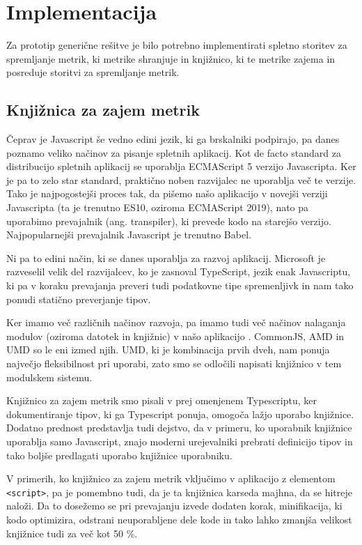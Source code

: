 \documentclass[a4paper, 12pt]{book}
\begin{document}
\section{Implementacija}
\label{ch3:sec2}

Za prototip generične rešitve je bilo potrebno implementirati spletno storitev za spremljanje metrik, ki metrike shranjuje in knjižnico, ki te metrike zajema in posreduje storitvi za spremljanje metrik.

\subsection{Knjižnica za zajem metrik}
\label{ch3:sec2:sub1}

Čeprav je Javascript še vedno edini jezik, ki ga brskalniki podpirajo, pa danes poznamo veliko načinov za pisanje spletnih aplikacij. Kot de facto standard za distribucijo spletnih aplikacij se uporablja ECMAScript 5 verzijo Javascripta. Ker je pa to zelo star standard, praktično noben razvijalec ne uporablja več te verzije. Tako je najpogostejši proces tak, da pišemo našo aplikacijo v novejši verziji Javascripta (ta je trenutno ES10, oziroma ECMAScript 2019), nato pa uporabimo prevajalnik (ang. transpiler), ki prevede kodo na starejšo verzijo. Najpopularnejši prevajalnik Javascript je trenutno Babel.

Ni pa to edini način, ki se danes uporablja za razvoj aplikacij. Microsoft je razveselil velik del razvijalcev, ko je zasnoval TypeScript, jezik enak Javascriptu, ki pa v koraku prevajanja preveri tudi podatkovne tipe spremenljivk in nam tako ponudi statično preverjanje tipov.

Ker imamo več različnih načinov razvoja, pa imamo tudi več načinov nalaganja modulov (oziroma datotek in knjižnic) v našo aplikacijo \cite{js_modules}. CommonJS, AMD in UMD so le eni izmed njih. UMD, ki je kombinacija prvih dveh, nam ponuja največjo fleksibilnost pri uporabi, zato smo se odločili napisati knjižnico v tem modulskem sistemu.

Knjižnico za zajem metrik smo pisali v prej omenjenem Typescriptu, ker dokumentiranje tipov, ki ga Typescript ponuja, omogoča lažjo uporabo knjižnice. Dodatno prednost predstavlja tudi dejstvo, da v primeru, ko uporabnik knjižnice uporablja samo Javascript, znajo moderni urejevalniki prebrati definicijo tipov in tako boljše predlagati uporabo knjižnice uporabniku.

V primerih, ko knjižnico za zajem metrik vključimo v aplikacijo z elementom \verb|<script>|, pa je pomembno tudi, da je ta knjižnica karseda majhna, da se hitreje naloži. Da to dosežemo se pri prevajanju izvede dodaten korak, minifikacija, ki kodo optimizira, odstrani neuporabljene dele kode in tako lahko zmanjša velikost knjižnice tudi za več kot 50 \%.
\end{document}

